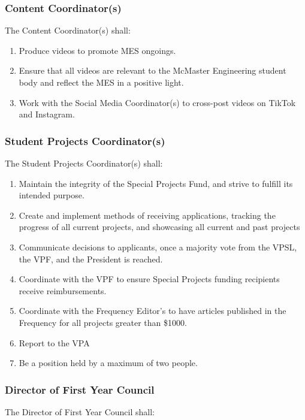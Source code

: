 \subsubsection{Content Coordinator(s)}
\label{content-coordinators}
The Content Coordinator(s) shall:

\begin{enumerate}
 \item Produce videos to promote MES ongoings.
 \item Ensure that all videos are relevant to the McMaster Engineering student body and reflect the MES in a positive light.
 \item Work with the Social Media Coordinator(s) to cross-post videos on TikTok and Instagram.
\end{enumerate}

\subsubsection{Student Projects Coordinator(s)}
\label{special-projects-coordinators}

The Student Projects Coordinator(s) shall:
\begin{enumerate}
 \item
  Maintain the integrity of the Special Projects Fund, and strive to fulfill its intended purpose.
 \item
  Create and implement methods of receiving applications, tracking the progress of all current projects, and showcasing all current and past projects
 \item
  Communicate decisions to applicants, once a majority vote from the VPSL, the VPF, and the President is reached.
 \item
  Coordinate with the VPF to ensure Special Projects funding recipients receive reimbursements.
 \item
  Coordinate with the Frequency Editor's to have articles published in the Frequency for all projects greater than \$1000.
 \item
  Report to the VPA
 \item
  Be a position held by a maximum of two people.

\end{enumerate}

\subsubsection{Director of First Year Council}
\label{director-first-year-council}
The Director of First Year Council shall:

